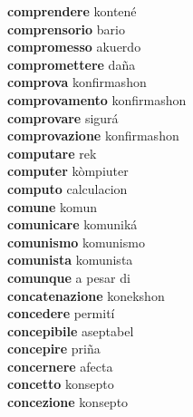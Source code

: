 \textbf{comprendere } kontené \\
\textbf{comprensorio } bario \\
\textbf{compromesso } akuerdo \\
\textbf{compromettere } daña \\
\textbf{comprova } konfirmashon \\
\textbf{comprovamento } konfirmashon \\
\textbf{comprovare } sigurá \\
\textbf{comprovazione } konfirmashon \\
\textbf{computare } rek \\
\textbf{computer } kòmpiuter \\
\textbf{computo } calculacion \\
\textbf{comune } komun \\
\textbf{comunicare } komuniká \\
\textbf{comunismo } komunismo \\
\textbf{comunista } komunista \\
\textbf{comunque } a pesar di \\
\textbf{concatenazione } konekshon \\
\textbf{concedere } permití \\
\textbf{concepibile } aseptabel \\
\textbf{concepire } priña \\
\textbf{concernere } afecta \\
\textbf{concetto } konsepto \\
\textbf{concezione } konsepto \\
